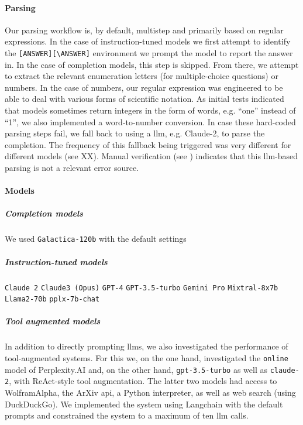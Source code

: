 \documentclass[11pt, oneside]{article}
\begin{document}
\paragraph{Parsing}
Our parsing workflow is, by default, multistep and primarily based on regular expressions.
In the case of instruction-tuned models we first attempt to identify the \texttt{[ANSWER][\textbackslash ANSWER]} environment we prompt the model to report the answer in.
In the case of completion models, this step is skipped. From there, we attempt to extract the relevant enumeration letters (for multiple-choice questions) or numbers.
In the case of numbers, our regular expression was engineered to be able to deal with various forms of scientific notation.
As initial tests indicated that models sometimes return integers in the form of words, e.g. \enquote{one} instead of \enquote{1}, we also implemented a word-to-number conversion.
In case these hard-coded parsing steps fail, we fall back to using a \gls{llm}, e.g. Claude-2, to parse the completion.
The frequency of this fallback being triggered was very different for different models (see XX).
Manual verification (see ) indicates that this \gls{llm}-based parsing is not a relevant error source.

\paragraph{Models}
\subparagraph{Completion models}
We used \texttt{Galactica-120b}\cite{taylor2022galactica} with the default settings 


\subparagraph{Instruction-tuned models} \texttt{Claude 2} \texttt{Claude3 (Opus)}\cite{anthropicClaudeModelFamily2024}
\texttt{GPT-4}\cite{openai2024gpt4}
\texttt{GPT-3.5-turbo}\cite{brown2020language}
\texttt{Gemini Pro}\cite{gemini}
\texttt{Mixtral-8x7b}\cite{jiang2024mixtral}
\texttt{Llama2-70b}\cite{touvron2023llama}
\texttt{pplx-7b-chat}

\subparagraph{Tool augmented models}
In addition to directly prompting \glspl{llm}, we also investigated the performance of tool-augmented systems.
For this we, on the one hand, investigated the \texttt{online} model of Perplexity.AI and, on the other hand, \texttt{gpt-3.5-turbo} as well as \texttt{claude-2}, with ReAct-style tool augmentation.\cite{yao2023react}
The latter two models had access to WolframAlpha, the ArXiv \gls{api}, a Python interpreter, as well as web search (using DuckDuckGo).
We implemented the system using Langchain with the default prompts and constrained the system to a maximum of ten \gls{llm} calls.
\end{document}
